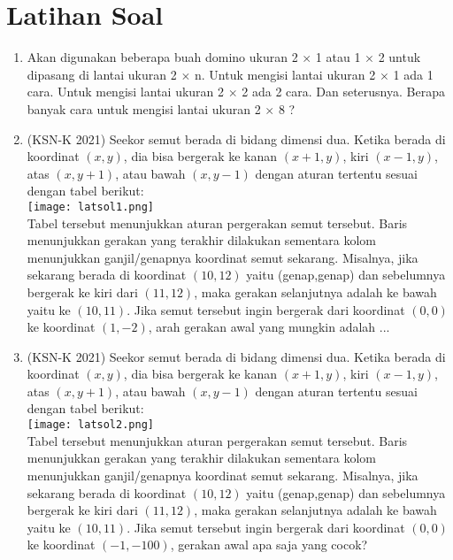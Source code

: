 \documentclass[11pt]{scrartcl}
\begin{document}
		    \section{Latihan Soal}
		    \begin{enumerate}
		    \item Akan digunakan beberapa buah domino ukuran 2 $\times$ 1 atau 1 $\times$ 2 untuk dipasang di lantai ukuran 2 $\times$ n.
		    Untuk mengisi lantai ukuran 2 $\times$ 1 ada 1 cara.
		    Untuk mengisi lantai ukuran 2 $\times$ 2 ada 2 cara. Dan seterusnya.
		    Berapa banyak cara untuk mengisi lantai ukuran 2 $\times$ 8 ?
		    
		    \item (KSN-K 2021) Seekor semut berada di bidang dimensi dua. Ketika berada di koordinat $(x,y)$, dia bisa 
	 	    bergerak ke kanan $(x+1,y)$, kiri $(x-1,y)$, atas $(x,y+1)$, atau bawah $(x,y-1)$ dengan aturan 
	 	    tertentu sesuai dengan tabel berikut:\\
	 	    	\texttt{[image: latsol1.png]}\\
	 	    Tabel tersebut menunjukkan aturan pergerakan semut tersebut. Baris menunjukkan 
	 	    gerakan yang terakhir dilakukan sementara kolom menunjukkan ganjil/genapnya
	 	    koordinat semut sekarang. Misalnya, jika sekarang berada di koordinat $(10,12)$ yaitu 
	 	    (genap,genap) dan sebelumnya bergerak ke kiri dari $(11,12)$, maka gerakan selanjutnya 
	 	    adalah ke bawah yaitu ke $(10,11)$. Jika semut tersebut ingin bergerak dari koordinat $(0,0)$
	 	    ke koordinat $(1,-2)$, arah gerakan awal yang mungkin adalah ...
	 	    
	 	    \item (KSN-K 2021) Seekor semut berada di bidang dimensi dua. Ketika berada di koordinat $(x,y)$, dia bisa 
	 	     	    bergerak ke kanan $(x+1,y)$, kiri $(x-1,y)$, atas $(x,y+1)$, atau bawah $(x,y-1)$ dengan aturan 
	 	     	    tertentu sesuai dengan tabel berikut:\\
	 	     	    \texttt{[image: latsol2.png]}\\
	 	    Tabel tersebut menunjukkan aturan pergerakan semut tersebut. Baris menunjukkan 
	 	    gerakan yang terakhir dilakukan sementara kolom menunjukkan ganjil/genapnya
	 	    koordinat semut sekarang. Misalnya, jika sekarang berada di koordinat $(10,12)$ yaitu 
	 	    (genap,genap) dan sebelumnya bergerak ke kiri dari $(11,12)$, maka gerakan selanjutnya 
	 	    adalah ke bawah yaitu ke $(10,11)$. Jika semut tersebut ingin bergerak dari koordinat $(0,0)$
	 	    ke koordinat $(-1,-100)$, gerakan awal apa saja yang cocok?
	 	    

\end{enumerate}
\end{document}
